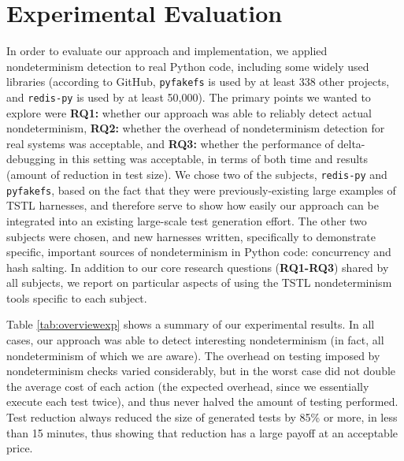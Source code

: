 \section{Experimental Evaluation}

In order to evaluate our approach and implementation, we applied
nondeterminism detection to real Python code, including some widely
used libraries (according to GitHub, {\tt pyfakefs} is used by at least
338 other projects, and {\tt redis-py} is used by at least 50,000).  The primary
points we wanted to explore were {\bf RQ1:} whether our approach was able to reliably detect actual
nondeterminism, {\bf RQ2:} whether the overhead of nondeterminism
detection for real systems was acceptable, and {\bf RQ3:} whether the performance of
delta-debugging in this setting was acceptable, in terms of both time
and results (amount of reduction in test size).  We chose two of
the subjects, {\tt redis-py} and {\tt pyfakefs}, based on the fact that they were previously-existing large
examples of TSTL harnesses, and therefore serve to show how easily our
approach can be integrated into an existing large-scale test
generation effort.  The other two subjects were chosen, and new harnesses
written, specifically to demonstrate specific, important sources of
nondeterminism in Python code: concurrency and hash salting.  In
addition to our core research questions ({\bf RQ1-RQ3}) shared by all subjects, we
report on particular aspects of using the TSTL nondeterminism tools
specific to each subject.

Table \ref{tab:overviewexp} shows a summary of our experimental
results.  In all cases, our approach was able to detect interesting
nondeterminism (in fact, all nondeterminism of which we are aware).  The overhead on testing imposed by nondeterminism
checks varied considerably, but in the worst case did not double the
average cost of each action (the expected overhead, since we
essentially execute each test twice), and thus never halved the amount of
testing performed.  Test reduction always reduced the size of
generated tests by 85\% or more, in less than 15 minutes, thus showing that reduction
has a large payoff at an acceptable price.

